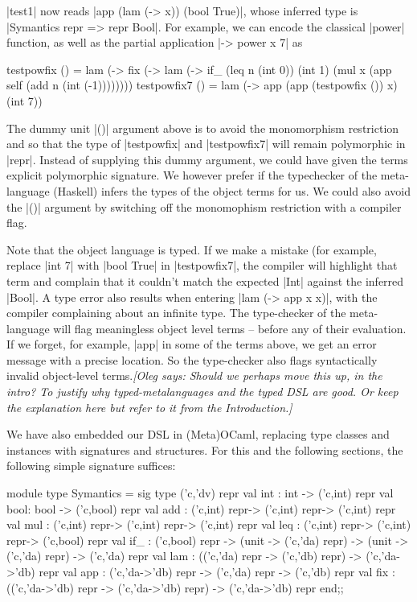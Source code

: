 \documentclass[preprint]{sigplanconf}
\newcommand{\oleg}[1]{{\it [Oleg says: #1]}}
\begin{document}
\noindent |test1| now reads |app (lam (\x -> x)) (bool True)|,
whose inferred type is |Symantics repr => repr Bool|.
For example, we can encode the classical |power| function, as well
as the partial application |\x -> power x 7| as

\begin{code}
testpowfix () = 
  lam (\x -> fix (\self -> lam (\n ->
        if_ (leq n (int 0)) (int 1)
            (mul x (app self (add n (int (-1))))))))
testpowfix7 () = 
  lam (\x -> app (app (testpowfix ()) x) (int 7))
\end{code}
The dummy unit |()| argument above is to avoid the monomorphism
restriction and so that the type of |testpowfix| and |testpowfix7|
will remain polymorphic in |repr|. Instead of supplying this dummy
argument, we could have given the terms explicit polymorphic
signature.  We however prefer if the typechecker of the meta-language
(Haskell) infers the types of the object terms for us. We could also
avoid the |()| argument by switching off the monomophism restriction
with a compiler flag.

Note that the object language is typed. If we make a mistake
(for example, replace |int 7| with |bool True| in |testpowfix7|, the
compiler will highlight that term and complain that it couldn't match
the expected |Int| against the inferred |Bool|. A type error
also results when entering |lam (\x -> app x x)|, with the compiler
complaining about an infinite type. The type-checker of the
meta-language will flag meaningless object level terms --
before any of their evaluation. If we forget, for example, |app| in
some of the terms above, we get an error message with a precise
location. So the type-checker also flags syntactically invalid
object-level terms.\oleg{Should we perhaps move this up, in the
  intro? To justify why typed-metalanguages and the typed DSL are
  good. Or keep the explanation here but refer to it from the Introduction.}

We have also embedded our DSL in (Meta)OCaml, replacing type classes
and instances with signatures and structures. For this and the 
following sections, the following simple signature suffices:

\begin{code}
module type Symantics = sig
  type ('c,'dv) repr
  val int : int  -> ('c,int) repr
  val bool: bool -> ('c,bool) repr
  val add : ('c,int) repr-> ('c,int) repr-> ('c,int) repr
  val mul : ('c,int) repr-> ('c,int) repr-> ('c,int) repr
  val leq : ('c,int) repr-> ('c,int) repr-> ('c,bool) repr
  val if_ : ('c,bool) repr ->
             (unit -> ('c,'da) repr) ->
             (unit -> ('c,'da) repr) -> ('c,'da) repr 
  val lam : (('c,'da) repr -> ('c,'db) repr) 
          -> ('c,'da->'db) repr
  val app : ('c,'da->'db) repr
    -> ('c,'da) repr -> ('c,'db) repr
  val fix : (('c,'da->'db) repr -> ('c,'da->'db) repr) 
            -> ('c,'da->'db) repr
end;;
\end{code}
\end{document}
